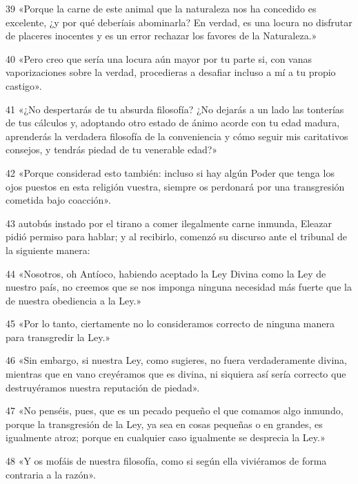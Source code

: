 \par 39 «Porque la carne de este animal que la naturaleza nos ha concedido es excelente, ¿y por qué deberíais abominarla? En verdad, es una locura no disfrutar de placeres inocentes y es un error rechazar los favores de la Naturaleza.»

\par 40 «Pero creo que sería una locura aún mayor por tu parte si, con vanas vaporizaciones sobre la verdad, procedieras a desafiar incluso a mí a tu propio castigo».

\par 41 «¿No despertarás de tu absurda filosofía? ¿No dejarás a un lado las tonterías de tus cálculos y, adoptando otro estado de ánimo acorde con tu edad madura, aprenderás la verdadera filosofía de la conveniencia y cómo seguir mis caritativos consejos, y tendrás piedad de tu venerable edad?»

\par 42 «Porque considerad esto también: incluso si hay algún Poder que tenga los ojos puestos en esta religión vuestra, siempre os perdonará por una transgresión cometida bajo coacción».

\par 43 autobús instado por el tirano a comer ilegalmente carne inmunda, Eleazar pidió permiso para hablar; y al recibirlo, comenzó su discurso ante el tribunal de la siguiente manera:

\par 44 «Nosotros, oh Antíoco, habiendo aceptado la Ley Divina como la Ley de nuestro país, no creemos que se nos imponga ninguna necesidad más fuerte que la de nuestra obediencia a la Ley.»

\par 45 «Por lo tanto, ciertamente no lo consideramos correcto de ninguna manera para transgredir la Ley.»

\par 46 «Sin embargo, si nuestra Ley, como sugieres, no fuera verdaderamente divina, mientras que en vano creyéramos que es divina, ni siquiera así sería correcto que destruyéramos nuestra reputación de piedad».

\par 47 «No penséis, pues, que es un pecado pequeño el que comamos algo inmundo, porque la transgresión de la Ley, ya sea en cosas pequeñas o en grandes, es igualmente atroz; porque en cualquier caso igualmente se desprecia la Ley.»

\par 48 «Y os mofáis de nuestra filosofía, como si según ella viviéramos de forma contraria a la razón».

